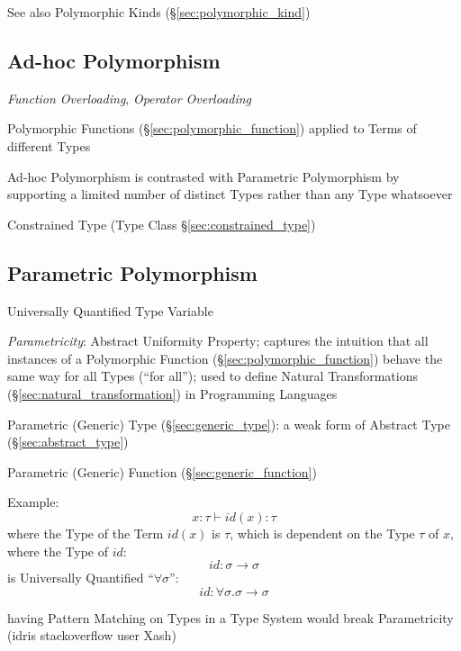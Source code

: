 \fist See also Polymorphic Kinds (\S\ref{sec:polymorphic_kind})



\subsection{Ad-hoc Polymorphism}\label{sec:adhoc_polymorphism}

\emph{Function Overloading}, \emph{Operator Overloading}

Polymorphic Functions (\S\ref{sec:polymorphic_function}) applied to
Terms of different Types

Ad-hoc Polymorphism is contrasted with Parametric Polymorphism by
supporting a limited number of distinct Types rather than any Type
whatsoever

Constrained Type (Type Class \S\ref{sec:constrained_type})



\subsection{Parametric Polymorphism}\label{sec:parametric_polymorphism}

Universally Quantified Type Variable

\emph{Parametricity}: Abstract Uniformity Property; captures the intuition that
all instances of a Polymorphic Function (\S\ref{sec:polymorphic_function})
behave the same way for all Types (``for all''); used to define Natural
Transformations (\S\ref{sec:natural_transformation}) in Programming Languages

Parametric (Generic) Type (\S\ref{sec:generic_type}): a weak form of Abstract
Type (\S\ref{sec:abstract_type})

Parametric (Generic) Function (\S\ref{sec:generic_function})

Example:
\[
  x:\tau \vdash id(x):\tau
\]
where the Type of the Term $id(x)$ is $\tau$, which is dependent on the Type
$\tau$ of $x$, where the Type of $id$:
\[
  id:\sigma \rightarrow \sigma
\]
is Universally Quantified ``$\forall \sigma$'':
\[
  id:\forall \sigma.\sigma \rightarrow \sigma
\]


having Pattern Matching on Types in a Type System would break Parametricity
(idris stackoverflow user Xash) %

